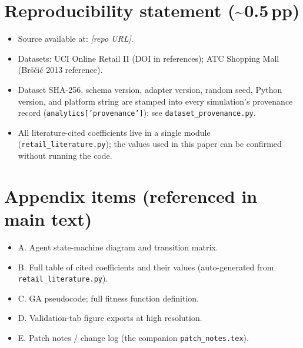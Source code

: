 \documentclass[11pt]{article}
\begin{document}
\section{Reproducibility statement (\textasciitilde 0.5\,pp)}

\begin{itemize}[leftmargin=*]
  \item Source available at: \emph{[repo URL]}.
  \item Datasets: UCI Online Retail II (DOI in references); ATC
    Shopping Mall (Bršči{\'c} 2013 reference).
  \item Dataset SHA-256, schema version, adapter version, random
    seed, Python version, and platform string are stamped into
    every simulation's provenance record
    (\texttt{analytics['provenance']}); see
    \texttt{dataset\_provenance.py}.
  \item All literature-cited coefficients live in a single module
    (\texttt{retail\_literature.py}); the values used in this paper
    can be confirmed without running the code.
\end{itemize}

\section{Appendix items (referenced in main text)}

\begin{itemize}[leftmargin=*]
  \item A. Agent state-machine diagram and transition matrix.
  \item B. Full table of cited coefficients and their values
    (auto-generated from \texttt{retail\_literature.py}).
  \item C. GA pseudocode; full fitness function definition.
  \item D. Validation-tab figure exports at high resolution.
  \item E. Patch notes / change log (the companion
    \texttt{patch\_notes.tex}).
\end{itemize}
\end{document}

